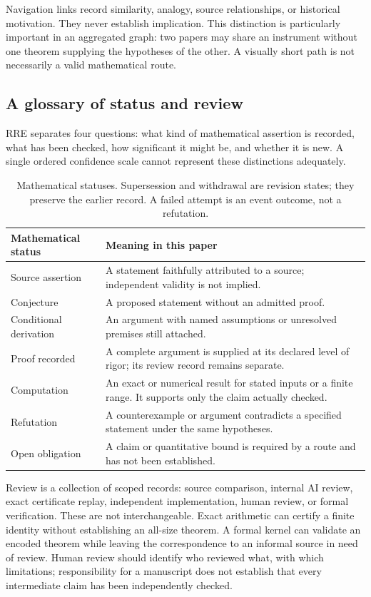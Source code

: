 Navigation links record similarity, analogy, source relationships, or historical motivation. They never establish implication. This distinction is particularly important in an aggregated graph: two papers may share an instrument without one theorem supplying the hypotheses of the other. A visually short path is not necessarily a valid mathematical route.

\subsection{A glossary of status and review}

RRE separates four questions: what kind of mathematical assertion is recorded, what has been checked, how significant it might be, and whether it is new. A single ordered confidence scale cannot represent these distinctions adequately.

\begin{table}[htbp]
\centering\small
\begin{tabularx}{\linewidth}{@{}p{2.7cm}Y@{}}
\toprule
Mathematical status & Meaning in this paper \\
\midrule
Source assertion & A statement faithfully attributed to a source; independent validity is not implied. \\
Conjecture & A proposed statement without an admitted proof. \\
Conditional derivation & An argument with named assumptions or unresolved premises still attached. \\
Proof recorded & A complete argument is supplied at its declared level of rigor; its review record remains separate. \\
Computation & An exact or numerical result for stated inputs or a finite range. It supports only the claim actually checked. \\
Refutation & A counterexample or argument contradicts a specified statement under the same hypotheses. \\
Open obligation & A claim or quantitative bound is required by a route and has not been established. \\
\bottomrule
\end{tabularx}
\caption{Mathematical statuses. Supersession and withdrawal are revision states; they preserve the earlier record. A failed attempt is an event outcome, not a refutation.}
\label{tab:statuses}
\end{table}

Review is a collection of scoped records: source comparison, internal AI review, exact certificate replay, independent implementation, human review, or formal verification. These are not interchangeable. Exact arithmetic can certify a finite identity without establishing an all-size theorem. A formal kernel can validate an encoded theorem while leaving the correspondence to an informal source in need of review. Human review should identify who reviewed what, with which limitations; responsibility for a manuscript does not establish that every intermediate claim has been independently checked.

